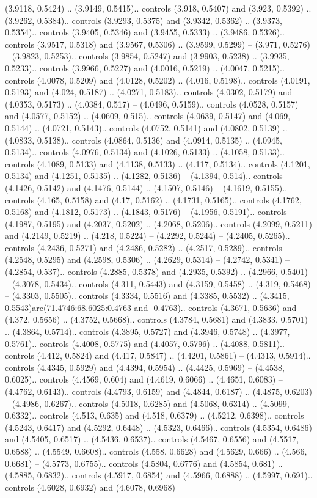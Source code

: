 (3.9118, 0.5424) .. (3.9149, 0.5415).. controls (3.918, 0.5407) and (3.923, 0.5392) .. (3.9262, 0.5384).. controls (3.9293, 0.5375) and (3.9342, 0.5362) .. (3.9373, 0.5354).. controls (3.9405, 0.5346) and (3.9455, 0.5333) .. (3.9486, 0.5326).. controls (3.9517, 0.5318) and (3.9567, 0.5306) .. (3.9599, 0.5299) -- (3.971, 0.5276) -- (3.9823, 0.5253).. controls (3.9854, 0.5247) and (3.9903, 0.5238) .. (3.9935, 0.5233).. controls (3.9966, 0.5227) and (4.0016, 0.5219) .. (4.0047, 0.5215).. controls (4.0078, 0.5209) and (4.0128, 0.5202) .. (4.016, 0.5198).. controls (4.0191, 0.5193) and (4.024, 0.5187) .. (4.0271, 0.5183).. controls (4.0302, 0.5179) and (4.0353, 0.5173) .. (4.0384, 0.517) -- (4.0496, 0.5159).. controls (4.0528, 0.5157) and (4.0577, 0.5152) .. (4.0609, 0.515).. controls (4.0639, 0.5147) and (4.069, 0.5144) .. (4.0721, 0.5143).. controls (4.0752, 0.5141) and (4.0802, 0.5139) .. (4.0833, 0.5138).. controls (4.0864, 0.5136) and (4.0914, 0.5135) .. (4.0945, 0.5134).. controls (4.0976, 0.5134) and (4.1026, 0.5133) .. (4.1058, 0.5133).. controls (4.1089, 0.5133) and (4.1138, 0.5133) .. (4.117, 0.5134).. controls (4.1201, 0.5134) and (4.1251, 0.5135) .. (4.1282, 0.5136) -- (4.1394, 0.514).. controls (4.1426, 0.5142) and (4.1476, 0.5144) .. (4.1507, 0.5146) -- (4.1619, 0.5155).. controls (4.165, 0.5158) and (4.17, 0.5162) .. (4.1731, 0.5165).. controls (4.1762, 0.5168) and (4.1812, 0.5173) .. (4.1843, 0.5176) -- (4.1956, 0.5191).. controls (4.1987, 0.5195) and (4.2037, 0.5202) .. (4.2068, 0.5206).. controls (4.2099, 0.5211) and (4.2149, 0.5219) .. (4.218, 0.5224) -- (4.2292, 0.5244) -- (4.2405, 0.5265).. controls (4.2436, 0.5271) and (4.2486, 0.5282) .. (4.2517, 0.5289).. controls (4.2548, 0.5295) and (4.2598, 0.5306) .. (4.2629, 0.5314) -- (4.2742, 0.5341) -- (4.2854, 0.537).. controls (4.2885, 0.5378) and (4.2935, 0.5392) .. (4.2966, 0.5401) -- (4.3078, 0.5434).. controls (4.311, 0.5443) and (4.3159, 0.5458) .. (4.319, 0.5468) -- (4.3303, 0.5505).. controls (4.3334, 0.5516) and (4.3385, 0.5532) .. (4.3415, 0.5543)arc(71.4746:68.6025:0.4763 and -0.4763).. controls (4.3671, 0.5636) and (4.372, 0.5656) .. (4.3752, 0.5668).. controls (4.3784, 0.5681) and (4.3833, 0.5701) .. (4.3864, 0.5714).. controls (4.3895, 0.5727) and (4.3946, 0.5748) .. (4.3977, 0.5761).. controls (4.4008, 0.5775) and (4.4057, 0.5796) .. (4.4088, 0.5811).. controls (4.412, 0.5824) and (4.417, 0.5847) .. (4.4201, 0.5861) -- (4.4313, 0.5914).. controls (4.4345, 0.5929) and (4.4394, 0.5954) .. (4.4425, 0.5969) -- (4.4538, 0.6025).. controls (4.4569, 0.604) and (4.4619, 0.6066) .. (4.4651, 0.6083) -- (4.4762, 0.6143).. controls (4.4793, 0.6159) and (4.4844, 0.6187) .. (4.4875, 0.6203) -- (4.4986, 0.6267).. controls (4.5018, 0.6285) and (4.5068, 0.6314) .. (4.5099, 0.6332).. controls (4.513, 0.635) and (4.518, 0.6379) .. (4.5212, 0.6398).. controls (4.5243, 0.6417) and (4.5292, 0.6448) .. (4.5323, 0.6466).. controls (4.5354, 0.6486) and (4.5405, 0.6517) .. (4.5436, 0.6537).. controls (4.5467, 0.6556) and (4.5517, 0.6588) .. (4.5549, 0.6608).. controls (4.558, 0.6628) and (4.5629, 0.666) .. (4.566, 0.6681) -- (4.5773, 0.6755).. controls (4.5804, 0.6776) and (4.5854, 0.681) .. (4.5885, 0.6832).. controls (4.5917, 0.6854) and (4.5966, 0.6888) .. (4.5997, 0.691).. controls (4.6028, 0.6932) and (4.6078, 0.6968) 